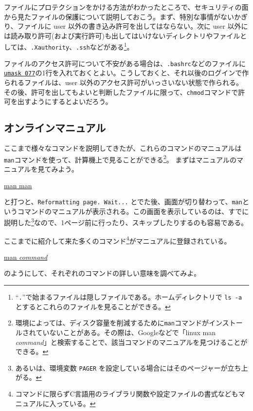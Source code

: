 ファイルにプロテクションをかける方法がわかったところで、セキュリティの面から見たファイルの保護について説明しておこう。まず、特別な事情がないかぎり、ファイルに user 以外の書き込み許可を出してはならない。次に user 以外には読み取り許可(および実行許可)も出してはいけないディレクトリやファイルとしては、\texttt{.Xauthority}、\texttt{.ssh}などがある\footnote{``\texttt{.}''で始まるファイルは隠しファイルである。ホームディレクトリで \texttt{ls -a} とするとこれらのファイルを見ることができる。}。

ファイルのアクセス許可について不安がある場合は、\texttt{.bashrc}などのファイルに
\underline{\texttt{umask 077}}の1行を入れておくとよい。こうしておくと、それ以後のログインで作られるファイルは、user 以外のアクセス許可がいっさいない状態で作られる。その後、許可を出してもよいと判断したファイルに限って、\texttt{chmod}コマンドで許可を出すようにするとよいだろう。

\subsection{オンラインマニュアル}
ここまで様々なコマンドを説明してきたが、これらのコマンドのマニュアルは\texttt{man}コマンドを使って、計算機上で見ることができる\footnote{環境によっては、ディスク容量を削減するために\texttt{man}コマンドがインストールされていないことがある。その際は、Googleなどで「linux man \textit{command}」と検索することで、該当コマンドのマニュアルを見つけることができる。}。
まずはマニュアルのマニュアルを見てみよう。
\begin{commandline2}
    \prompt \underline{man man}
\end{commandline2} \noindent
と打つと、\texttt{Reformatting page.  Wait...} とでた後、画面が切り替わって、\texttt{man}というコマンドのマニュアルが表示される。この画面を表示しているのは、すでに説明した\texttt{\pager}\footnote{あるいは、環境変数 \texttt{PAGER} を設定している場合にはそのページャーが立ち上がる。}なので、1ページ前に行ったり、スキップしたりするのも容易である。

ここまでに紹介して来た多くのコマンド\footnote{コマンドに限らずC言語用のライブラリ関数や設定ファイルの書式などもマニュアルに入っている。}がマニュアルに登録されている。
\begin{commandline2}
    \prompt \underline{man \textit{command}}
\end{commandline2} \noindent
のようにして、それぞれのコマンドの詳しい意味を調べてみよ。

